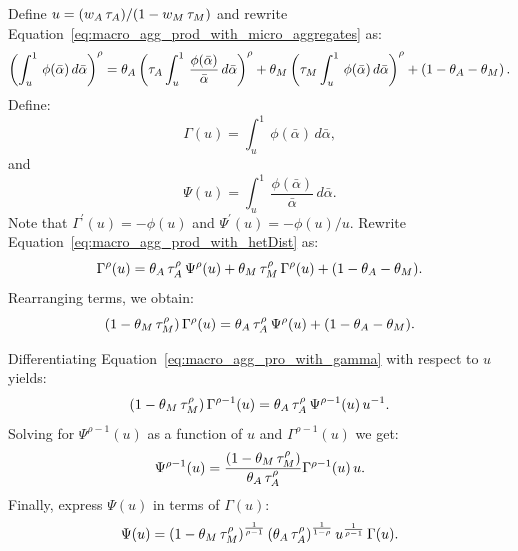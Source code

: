 Define $u=({w_{A}\,\tau_{A}})/(1-w_{M}\,\tau_{M})$ and rewrite Equation~\eqref{eq:macro_agg_prod_with_micro_aggregates} as:
\begin{equation}
\left(\int_{u}^{1}\,\phi(\bar{\alpha})\,d\bar{\alpha}\right)^{\rho}
=
\theta_{A}\left(\tau_{A}\int_{u}^{1}\,\frac{\phi(\bar{\alpha})}{\bar{\alpha}}\,d\bar{\alpha}\right)^{\rho}
+
\theta_{M} \left(\tau_{M}\int_{u}^{1}\,\phi(\bar{\alpha})\,d\bar{\alpha}\right)^{\rho}
+
\left(1-\theta_{A}-\theta_{M}\right).
\label{eq:macro_agg_prod_with_hetDist}
\end{equation}
Define:
\begin{equation}
\Gamma(u)=\int_{u}^{1}\,\phi(\bar{\alpha})\,d\bar{\alpha},\label{eq:gamma}
\end{equation}
and
\begin{equation}
\Psi(u)=\int_{u}^{1}\,\frac{\phi(\bar{\alpha})}{\bar{\alpha}}\,d\bar{\alpha}.\label{eq:psi}
\end{equation}
Note that $\Gamma^{'}(u)=-\phi(u)$ and $\Psi^{'}(u)=-\phi(u)/u$.
Rewrite Equation~\eqref{eq:macro_agg_prod_with_hetDist} as:
\[
\Gamma^{\rho}(u)=\theta_{A}\,\tau_{A}^{\rho}\,\Psi^{\rho}(u)+\theta_{M}\,\tau_{M}^{\rho}\,\Gamma^{\rho}(u)+(1-\theta_{A}-\theta_{M}).
\]
Rearranging terms, we obtain:
\begin{equation}
\left(1-\theta_{M}\,\tau_{M}^{\rho}\right)\Gamma^{\rho}(u)=\theta_{A}\,\tau_{A}^{\rho}\,\Psi^{\rho}(u)+(1-\theta_{A}-\theta_{M}).\label{eq:macro_agg_pro_with_gamma}
\end{equation}

Differentiating Equation~\eqref{eq:macro_agg_pro_with_gamma} with respect to $u$ yields:
\[
\left(1-\theta_{M}\,\tau_{M}^{\rho}\right)\Gamma^{\rho-1}(u)=\theta_{A}\,\tau_{A}^{\rho}\,\Psi^{\rho-1}(u)\,u^{-1}.
\]
Solving for $\Psi^{\rho-1}(u)$ as a function of $u$ and $\Gamma^{\rho-1}(u)$ we get:
\[
\Psi^{\rho-1}(u)=\frac{\left(1-\theta_{M}\,\tau_{M}^{\rho}\right)}{\theta_{A}\,\tau_{A}^{\rho}}\Gamma^{\rho-1}(u)\,u.
\]
Finally, express $\Psi(u)$ in terms of $\Gamma(u)$:
\begin{equation}
\Psi(u)=\left(1-\theta_{M}\,\tau_{M}^{\rho}\right)^{\frac{1}{\rho-1}}\left(\theta_{A}\,\tau_{A}^{\rho}\right)^{\frac{1}{1-\rho}}u^{\frac{1}{\rho-1}}\,\Gamma(u).\label{eq:psi_solved}
\end{equation}


